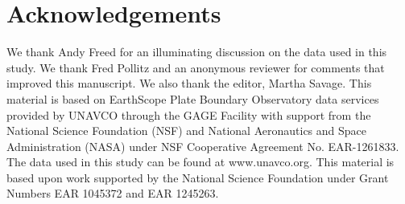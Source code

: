 \section{Acknowledgements}
We thank Andy Freed for an illuminating discussion on the data used in this study.  We thank Fred Pollitz and an anonymous reviewer for comments that improved this manuscript. We also thank the editor, Martha Savage.  This material is based on EarthScope Plate Boundary Observatory data services provided by UNAVCO through the GAGE Facility with support from the National Science Foundation (NSF) and National Aeronautics and Space Administration (NASA) under NSF Cooperative Agreement No. EAR-1261833.  The data used in this study can be found at www.unavco.org. This material is based upon work supported by the National Science Foundation under Grant Numbers EAR 1045372 and EAR 1245263.



